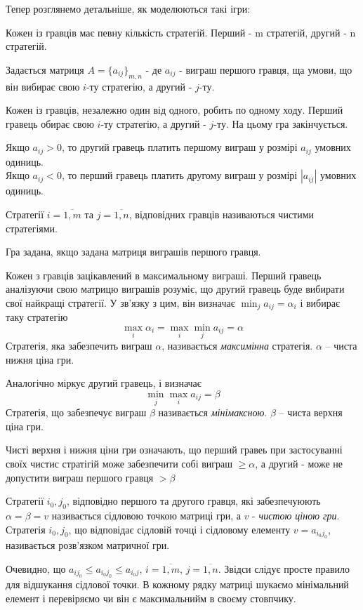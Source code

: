\documentclass[12pt,a4paper]{book}
\begin{document}
Тепер розглянемо детальніше, як моделюються такі ігри:

Кожен із гравців має певну кількість стратегій. Перший - m стратегій, другий - n стратегій.

Задається матриця $A=\{a_{ij}\}_{m, n}$ - де $a_{ij}$ - виграш першого гравця, ща умови, що він вибирає свою $i$-ту стратегію, а другий - $j$-ту.

Кожен із гравців, незалежно один від одного, робить по одному ходу. Перший гравець обирає свою $i$-ту стратегію, а другий - $j$-ту. На цьому гра закінчується.

Якщо $a_{ij}>0$, то другий гравець платить першому виграш у розмірі $a_{ij}$ умовних одиниць.\\
Якщо $a_{ij}<0$, то перший гравець платить другому виграш у розмірі $|a_{ij}|$ умовних одиниць.

Стратегії $i=\overline{1, m}$ та $j=\overline{1, n}$, відповідних гравців називаються чистими стратегіями.

Гра задана, якщо задана матриця виграшів першого гравця.

Кожен з гравців зацікавлений в максимальному виграші. Перший гравець аналізуючи свою матрицю виграшів розуміє, що другий гравець буде вибирати свої найкращі стратегії. У зв'язку з цим, він визначає $\displaystyle \min_j a_{ij} = \alpha_i$ і вибирає таку стратегію
\begin{equation}
	\max_i \alpha_i = \max_i \min_j a_{ij} = \alpha
\end{equation}
Стратегія, яка забезпечить виграш $\alpha$, називається \emph{максимінна} стратегія. $\alpha$ -- чиста нижня ціна гри.

Аналогічно міркує другий гравець, і визначає
\[
	\min_j \max_i a_{ij} = \beta
\]
Стратегія, що забезпечує виграш $\beta$ називається \emph{мінімаксною}. $\beta$ -- чиста верхня ціна гри.

Чисті верхня і нижня ціни гри означають, що перший гравеь при застосуванні своїх чистис стратігій може забезпечити собі виграш $\ge\alpha$, а другий - може не допустити виграш першого гравця $>\beta$

Стратегії $i_0, j_0$, відповідно першого та другого гравця, які забезпечуюють $\alpha = \beta = v$ називається сідловою точкою матриці гри, а $v$ - \emph{чистою ціною гри}.
Стратегія $i_0, j_0$, що відповідає сідловій точці і сідловому елементу $v=a_{i_0j_0}$, називається розв'язком матричної гри.

Очевидно, що $a_{ij_0} \le a_{i_0j_0} \le a_{i_0j},\,i=\overline{1, m},\,j=\overline{1, n}$. Звідси слідує просте правило для відшукання сідлової точки. В кожному рядку матриці шукаємо мінімальний елемент і перевіряємо чи він є максимальнийм в своєму стовпчику.
\end{document}
